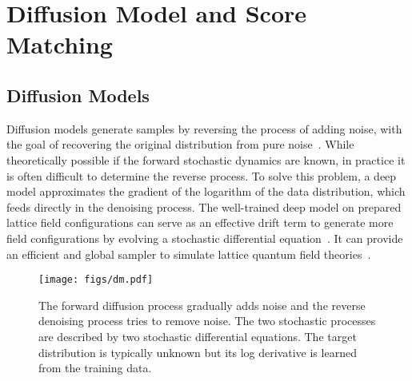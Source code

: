 \documentclass[a4paper,11pt]{article}
\begin{document}
\section{Diffusion Model and Score Matching}
\label{sec:diffusion_models}

\subsection{Diffusion Models}
Diffusion models generate samples by reversing the process of adding noise, with the goal of recovering the original distribution from pure noise~\cite{bishop2023deep}. While theoretically possible if the forward stochastic dynamics are known, in practice it is often difficult to determine the reverse process. To solve this problem, a deep model approximates the gradient of the logarithm of the data distribution, which feeds directly in the denoising process. The well-trained deep model on prepared lattice field configurations can serve as an effective drift term to generate more field configurations by evolving a stochastic differential equation~\cite{Wang:2023exq}. It can provide an efficient and global sampler to simulate lattice quantum field theories~\cite{Wang:2023exq,Wang:2023sry,Aarts:2024rsl,Aarts:2024agm}.

\begin{figure}[!htbp]
\begin{center}
\texttt{[image: figs/dm.pdf]}
\caption{The forward diffusion process gradually adds noise and the reverse denoising process tries to remove noise. The two stochastic processes are described by two stochastic differential equations. The target distribution is typically unknown but its log derivative is learned from the training data.
}
\label{fig:dm}
\end{center}
\end{figure}
\end{document}
